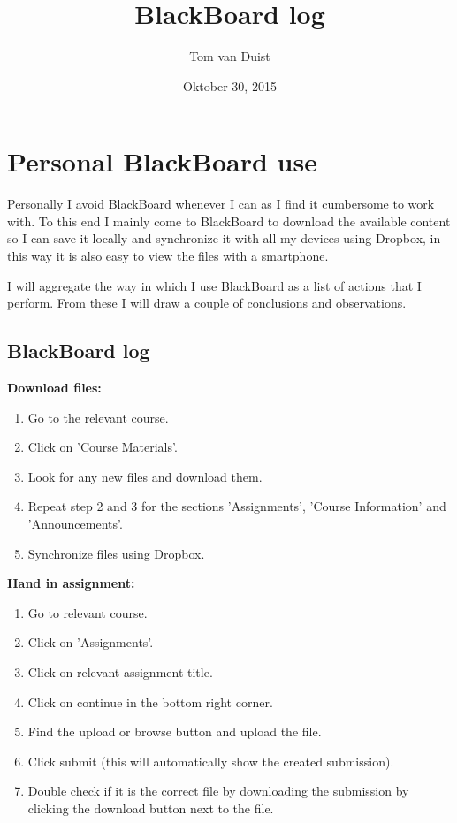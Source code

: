 

\title{BlackBoard log}
\what{}
\supervisors{}
\author{Tom van Duist}
\date{Oktober 30, 2015}




\maketitle



\clearpage

\chapter{Personal BlackBoard use}
Personally I avoid BlackBoard whenever I can as I find it cumbersome to work with. To this end I mainly come to BlackBoard to download the available content so I can save it locally and synchronize it with all my devices using Dropbox, in this way it is also easy to view the files with a smartphone.

I will aggregate the way in which I use BlackBoard as a list of actions that I perform. From these I will draw a couple of conclusions and observations.


\section{BlackBoard log}

\textbf{Download files:}
\begin{enumerate}
	\item Go to the relevant course.
	\item Click on 'Course Materials'.
	\item Look for any new files and download them.
	\item Repeat step 2 and 3 for the sections 'Assignments', 'Course Information' and 'Announcements'.
	\item Synchronize files using Dropbox.
\end{enumerate}

\textbf{Hand in assignment:}
\begin{enumerate}
	\item Go to relevant course.
	\item Click on 'Assignments'.
	\item Click on relevant assignment title.
	\item Click on continue in the bottom right corner.
	\item Find the upload or browse button and upload the file.
	\item Click submit (this will automatically show the created submission).
	\item Double check if it is the correct file by downloading the submission by clicking the download button next to the file.
\end{enumerate}


